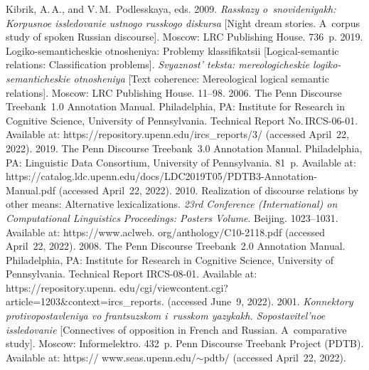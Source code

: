 \begin{multicols}{2}
{{\begin{thebibliography}{99}
Kibrik, A.\,A., and V.\,M.~Podlesskaya, eds. 2009. \textit{Rasskazy o~snovideniyakh: 
Korpusnoe issledovanie ustnogo russkogo diskursa} [Night dream stories. A~corpus 
study of spoken Russian discourse]. Moscow: LRC Publishing House. 736~p.
 2019. Logiko-semanticheskie otnosheniya: Problemy 
klassifikatsii [Logical-semantic relations: Classification problems]. \textit{Svyaznost' 
teksta: mereologicheskie logiko-semanticheskie otnosheniya} [Text coherence: 
Mereological logical semantic relations]. Moscow: LRC Publishing House. 11--98.
2006. The Penn Discourse Treebank~1.0 Annotation Manual. 
Philadelphia, PA: Institute for Research in Cognitive Science, University of Pennsylvania. Technical Report No.\,IRCS-06-01. 
Available at: {\sf 
https://repository.upenn.edu/ircs\_reports/3/} (accessed April~22, 2022).
 2019. The Penn Discourse 
Treebank~3.0 Annotation Manual. Philadelphia, PA: Linguistic Data Consortium, University of Pennsylvania. 
81~p.  Available at: {\sf 
https://catalog.\linebreak ldc.upenn.edu/docs/LDC2019T05/PDTB3-Annotation-Manual.pdf} 
(accessed April~22, 2022).
 2010. Realization of discourse relations by 
other means: Alternative lexicalizations. \textit{23rd Conference (International) on 
Computational Linguistics Proceedings: Posters Volume}. Beijing. 1023--1031. Available at: {\sf 
https://www.aclweb. org/anthology/C10-2118.pdf} (accessed April~22, 2022).
 2008. The Penn Discourse Treebank~2.0 Annotation Manual. 
Philadelphia, PA: Institute for Research in Cognitive Science, University of 
Pennsylvania. Technical Report IRCS-08-01. Available at: 
{\sf https://repository.upenn. edu/cgi/viewcontent.cgi?article=1203\&context=ircs\_\linebreak reports}. 
(accessed June~9, 2022). 
 2001. \textit{Konnektory protivopostavleniya vo 
frantsuzskom i~russkom yazykakh. Sopostavitel'noe issledovanie} [Connectives of 
opposition in French and Russian. A~comparative study]. Moscow: Informelektro. 
432~p.
Penn Discourse Treebank Project (PDTB). Available at: {\sf  
https:// www.seas.upenn.edu/$\sim$pdtb/} (accessed April~22, 2022).

\end{thebibliography}}}
\end{multicols}
